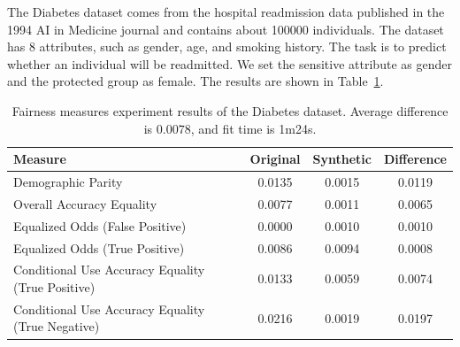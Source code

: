 \documentclass[manuscript,screen,review,anonymous]{acmart}
\begin{document}
The Diabetes\cite{diabetes_34,Kaggle_Diabetes_Prediction} dataset comes from the hospital readmission data published in the 1994 AI in Medicine journal and contains about 100000 individuals. The dataset has 8 attributes, such as gender, age, and smoking history. The task is to predict whether an individual will be readmitted. We set the sensitive attribute as gender and the protected group as female. The results are shown in Table~\ref{tab:diabetes_score}.




\begin{table}[h]
\caption{
    Fairness measures experiment results of the Diabetes dataset.
    Average difference is $0.0078$, and fit time is 1m24s.
}
\label{tab:diabetes_score}
\begin{tabular}{lccc}
\toprule
\textbf{Measure} & \textbf{Original} & \textbf{Synthetic} & \textbf{Difference} \\
\midrule
Demographic Parity  & 0.0135 & 0.0015 & 0.0119 \\
Overall Accuracy Equality   & 0.0077 & 0.0011 & 0.0065 \\
Equalized Odds (False Positive)    & 0.0000 & 0.0010 & 0.0010 \\
Equalized Odds (True Positive)    & 0.0086 & 0.0094 & 0.0008 \\
Conditional Use Accuracy Equality (True Positive) & 0.0133 & 0.0059 & 0.0074 \\
Conditional Use Accuracy Equality (True Negative) & 0.0216 & 0.0019 & 0.0197 \\
\bottomrule
\end{tabular}
\end{table}
\end{document}
